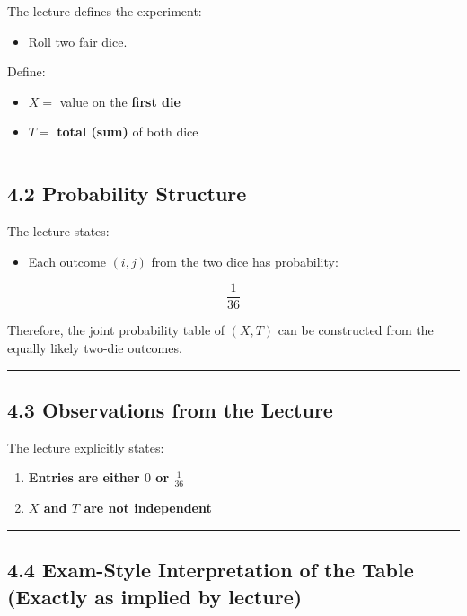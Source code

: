 \documentclass[12pt]{article}
\begin{document}
The lecture defines the experiment:

\begin{itemize}
    \item Roll two fair dice.
\end{itemize}

Define:

\begin{itemize}
    \item \(X =\) value on the \textbf{first die}
    \item \(T =\) \textbf{total (sum)} of both dice
\end{itemize}

\hrule
\vspace{1em}

\subsection*{4.2 Probability Structure}

The lecture states:

\begin{itemize}
    \item Each outcome \((i,j)\) from the two dice has probability:
\end{itemize}

\[
\frac{1}{36}
\]

Therefore, the joint probability table of \((X,T)\) can be constructed from the equally likely two-die outcomes.

\hrule
\vspace{1em}

\subsection*{4.3 Observations from the Lecture}

The lecture explicitly states:

\begin{enumerate}
    \item \textbf{Entries are either \(0\) or \(\frac{1}{36}\)}
    \item \textbf{\(X\) and \(T\) are not independent}
\end{enumerate}

\hrule
\vspace{1em}

\subsection*{4.4 Exam-Style Interpretation of the Table (Exactly as implied by lecture)}
\end{document}
